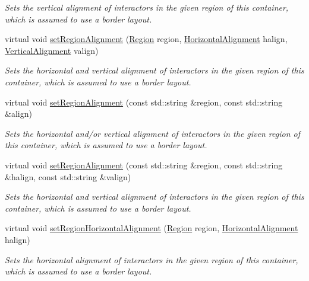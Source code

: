 \begin{DoxyCompactItemize}
\begin{DoxyCompactList}\small\item\em Sets the vertical alignment of interactors in the given region of this container, which is assumed to use a border layout. \end{DoxyCompactList}\item 
virtual void \mbox{\hyperlink{classsgl_1_1GContainer_ab4d2bfcca7a18da2847e7b4494da4a16}{set\+Region\+Alignment}} (\mbox{\hyperlink{classsgl_1_1GContainer_a81a01a86de31071a92e6cce0bab9bc4b}{Region}} region, \mbox{\hyperlink{namespacesgl_aa00e70829e72ff16addc4d9f06fe3bc5}{Horizontal\+Alignment}} halign, \mbox{\hyperlink{namespacesgl_a9c2ed22cfbd21f13df24ea193b310aee}{Vertical\+Alignment}} valign)
\begin{DoxyCompactList}\small\item\em Sets the horizontal and vertical alignment of interactors in the given region of this container, which is assumed to use a border layout. \end{DoxyCompactList}\item 
virtual void \mbox{\hyperlink{classsgl_1_1GContainer_ae4ff46516be9472498c0bf058b496e8b}{set\+Region\+Alignment}} (const std\+::string \&region, const std\+::string \&align)
\begin{DoxyCompactList}\small\item\em Sets the horizontal and/or vertical alignment of interactors in the given region of this container, which is assumed to use a border layout. \end{DoxyCompactList}\item 
virtual void \mbox{\hyperlink{classsgl_1_1GContainer_ad1c76be81b3b865f78b0e91f0e1f07d4}{set\+Region\+Alignment}} (const std\+::string \&region, const std\+::string \&halign, const std\+::string \&valign)
\begin{DoxyCompactList}\small\item\em Sets the horizontal and vertical alignment of interactors in the given region of this container, which is assumed to use a border layout. \end{DoxyCompactList}\item 
virtual void \mbox{\hyperlink{classsgl_1_1GContainer_aca8f01ef261afca9c843589e8be54134}{set\+Region\+Horizontal\+Alignment}} (\mbox{\hyperlink{classsgl_1_1GContainer_a81a01a86de31071a92e6cce0bab9bc4b}{Region}} region, \mbox{\hyperlink{namespacesgl_aa00e70829e72ff16addc4d9f06fe3bc5}{Horizontal\+Alignment}} halign)
\begin{DoxyCompactList}\small\item\em Sets the horizontal alignment of interactors in the given region of this container, which is assumed to use a border layout. \end{DoxyCompactList}\item 

\end{DoxyCompactItemize}
